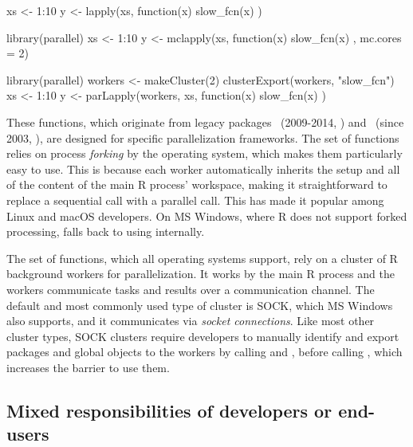 \begin{example}
xs <- 1:10
y <- lapply(xs, function(x) {
  slow_fcn(x)
})
\end{example}

\begin{example}
library(parallel)
xs <- 1:10
y <- mclapply(xs, function(x) {
  slow_fcn(x)
}, mc.cores = 2)
\end{example}

\begin{example}
library(parallel)
workers <- makeCluster(2)
clusterExport(workers, "slow_fcn")
xs <- 1:10
y <- parLapply(workers, xs, function(x) {
  slow_fcn(x)
})
\end{example}
%
These functions, which originate from legacy packages
~(2009-2014, \citet{CRAN:multicore}) and
~(since 2003, \citet{CRAN:snow}), are designed for
specific parallelization frameworks. The  set of
functions relies on process \emph{forking} by the operating system,
which makes them particularly easy to use.  This is because each
worker automatically inherits the setup and all of the content of the
main R process' workspace, making it straightforward to replace a
sequential
 call with a parallel  call. This
has made it popular among Linux and macOS developers. On MS Windows,
where R does not support forked processing,  falls
back to using  internally.

The  set of functions, which all operating systems
support, rely on a cluster of R background workers for
parallelization. It works by the main R process and the workers
communicate tasks and results over a communication channel. The
default and most commonly used type of cluster is SOCK, which MS
Windows also supports, and it communicates via \emph{socket
connections}. Like most other cluster types, SOCK clusters require
developers to manually identify and export packages and global objects
to the workers by calling  and
, before calling , which
increases the barrier to use them.

\subsection{Mixed responsibilities of developers or end-users}
\label{mixed-responsibilities}

